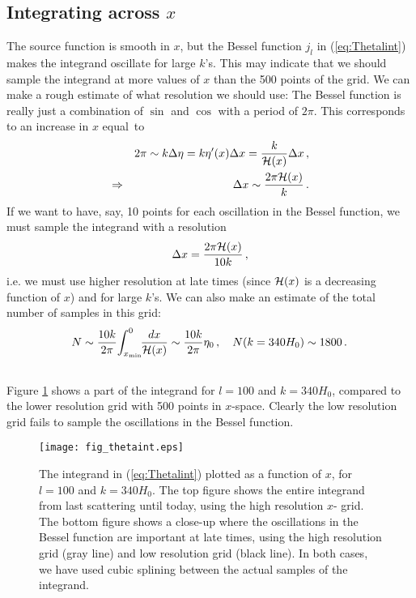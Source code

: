 \documentclass[twocolumn,nofootinbib,amsmath,amssymb]{revtex4}
\newcommand{\be}{\begin{equation}}
\newcommand{\ee}{\end{equation}}
\newcommand{\ba}{\begin{eqnarray}}
\newcommand{\ea}{\end{eqnarray}}
\begin{document}
\subsection{Integrating across $x$}
\label{cha:xintegration}

The source function is smooth in $x$, but the Bessel function $j_l$ in
(\ref{eq:Thetalint}) makes the integrand oscillate for large $k$'s. This may
indicate that we should sample the integrand at more values of $x$ than the 500
points of the grid. We can make a rough estimate of what resolution we should
use: The Bessel function is really just a combination of $\sin$ and $\cos$ with
a period of $2\pi$. This corresponds to an increase in $x$ equal~to
\ba
  && 2\pi \sim k\Delta\eta = k\eta'(x)\Delta x =
    \frac{k}{{\cal H}(x)} \Delta x \, , \nonumber \\
  \Rightarrow && \Delta x \sim \frac{2\pi{\cal H}(x)}{k} \, .
\ea
If we want to have, say, 10 points for each oscillation in the Bessel function,
we must sample the integrand with a resolution
\be
  \Delta x = \frac{2\pi{\cal H}(x)}{10k} \, ,
\ee
i.e. we must use higher resolution at late times (since ${\cal H}(x)$ is a
decreasing function of $x$) and for large $k$'s. We can also make an estimate
of the total number of samples in this grid:
\ba
  && \hspace{-4mm} N \sim \frac{10k}{2\pi} \!\int_{x_{\min}}^0 \!\!
    \frac{dx}{{\cal H}(x)} \sim \frac{10k}{2\pi} \eta_0 \, , \quad
  N(k = 340 H_0) \sim 1800 \, . \nonumber \\
  &&
\ea
Figure \ref{fig:xintegration} shows a part of the integrand for $l = 100$ and
$k = 340 H_0$, compared to the lower resolution grid with 500 points in
$x$-space. Clearly the low resolution grid fails to sample the oscillations in
the Bessel function.

\begin{figure}[!h]
  \begin{center}
    \texttt{[image: fig\_thetaint.eps]}
  \end{center}
  \vspace{-6mm}
  \caption{The integrand in (\ref{eq:Thetalint}) plotted as a function of
  $x$, for $l = 100$ and $k = 340 H_0$. The top figure shows the entire
  integrand from last scattering until today, using the high resolution $x$-
  grid. The bottom figure shows a close-up where the oscillations in the
  Bessel function are important at late times, using the high resolution grid
  (gray line) and low resolution grid (black line). In both cases, we have used
  cubic splining between the actual samples of the integrand.}
  \label{fig:xintegration}
\end{figure}
\end{document}
